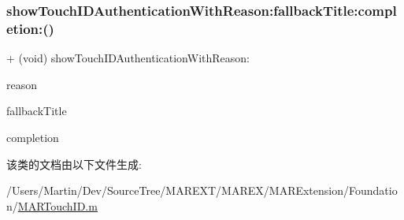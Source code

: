 \mbox{\label{class_m_a_r_touch_i_d_a0e505448389e6bccea0bd5fc6bf9e744}} 
\subsubsection{\texorpdfstring{show\+Touch\+I\+D\+Authentication\+With\+Reason\+:fallback\+Title\+:completion\+:()}{showTouchIDAuthenticationWithReason:fallbackTitle:completion:()}}
{\footnotesize\ttfamily + (void) show\+Touch\+I\+D\+Authentication\+With\+Reason\+: \begin{DoxyParamCaption}\item[{(N\+S\+String $\ast$ \+\_\+\+Nonnull)}]{reason }\item[{fallbackTitle:(N\+S\+String $\ast$ \+\_\+\+Nullable)}]{fallback\+Title }\item[{completion:(void($^\wedge$ \+\_\+\+Nullable)(M\+A\+R\+Touch\+I\+D\+Result))}]{completion }\end{DoxyParamCaption}\hspace{0.3cm}{\ttfamily [implementation]}}



该类的文档由以下文件生成\+:\begin{DoxyCompactItemize}
\item 
/\+Users/\+Martin/\+Dev/\+Source\+Tree/\+M\+A\+R\+E\+X\+T/\+M\+A\+R\+E\+X/\+M\+A\+R\+Extension/\+Foundation/\hyperlink{_m_a_r_touch_i_d_8m}{M\+A\+R\+Touch\+I\+D.\+m}\end{DoxyCompactItemize}
